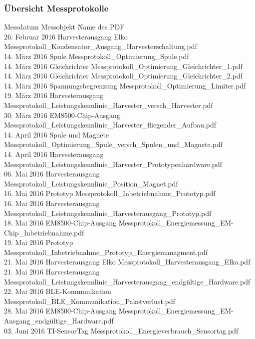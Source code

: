 \subsubsection*{Übersicht Messprotokolle  }
\label{tabelle_uebersicht_messprotokolle}
\begin{tabbing}
       Messdatum	   	\quad\= Messobjekt    		\quad\= Name des PDF     \\[0.8ex]
	   26. Februar 2016 \> Harvesterausgang Elko 	\> Messprotokoll\_Kondensator\_Ausgang\_Harvesterschaltung.pdf\\
	   14. März 2016 	\> Spule 					\> Messprotokoll\_Optimierung\_Spule.pdf\\
	   14. März 2016 	\> Gleichrichter 			\> Messprotokoll\_Optimierung\_Gleichrichter\_1.pdf\\
	   14. März 2016 	\> Gleichrichter 			\> Messprotokoll\_Optimierung\_Gleichrichter\_2.pdf\\
	   14. März 2016 	\> Spannungsbegrenzung 		\> Messprotokoll\_Optimierung\_Limiter.pdf\\
	   19. März 2016 	\> Harvesterausgang 		\> Messprotokoll\_Leistungskennlinie\_Harvester\_versch\_Harvester.pdf\\
	   30. März 2016 	\> EM8500-Chip-Ausgang 		\> Messprotokoll\_Leistungskennlinie\_Harvester\_fliegender\_Aufbau.pdf\\
	   14. April 2016 	\> Spule und Magnete 		\> Messprotokoll\_Optimierung\_Spule\_versch\_Spulen\_und\_Magnete.pdf\\
	   14. April 2016 	\> Harvesterausgang 		\> Messprotokoll\_Leistungskennlinie\_Harvester\_Prototypenhardware.pdf\\
	   06. Mai 2016 	\> Harvesterausgang 		\> Messprotokoll\_Leistungskennlinie\_Position\_Magnet.pdf\\
	   16. Mai 2016 	\> Prototyp 				\> Messprotokoll\_Inbetriebnahme\_Prototyp.pdf\\
	   16. Mai 2016 	\> Harvesterausgang 		\> Messprotokoll\_Leistungskennlinie\_Harvesterausgang\_Prototyp.pdf\\
       18. Mai 2016 	\> EM8500-Chip-Ausgang 		\> Messprotokoll\_Energiemessung\_EM-Chip\_Inbetriebnahme.pdf\\	   
	   19. Mai 2016 	\> Prototyp 				\> Messprotokoll\_Inbetriebnahme\_Prototyp\_Energiemanagment.pdf\\
	   21. Mai 2016 	\> Harvesterausgang Elko 	\> Messprotokoll\_Harvesterausgang\_Elko.pdf\\
	   21. Mai 2016 	\> Harvesterausgang 		\> Messprotokoll\_Leistungskennlinie\_Harvesterausgang\_endgültige\_Hardware.pdf\\
	   22. Mai 2016 	\> BLE-Kommunikation 		\> Messprotokoll\_BLE\_Kommunikation\_Paketverlust.pdf\\ %
	   28. Mai 2016 	\> EM8500-Chip-Ausgang 		\> Messprotokoll\_Energiemessung\_EM-Ausgang\_endgültige\_Hardware.pdf\\ %
	   03. Juni 2016 	\> TI-SensorTag 			\> Messprotokoll\_Energieverbrauch\_Sensortag.pdf\\
\end{tabbing}  